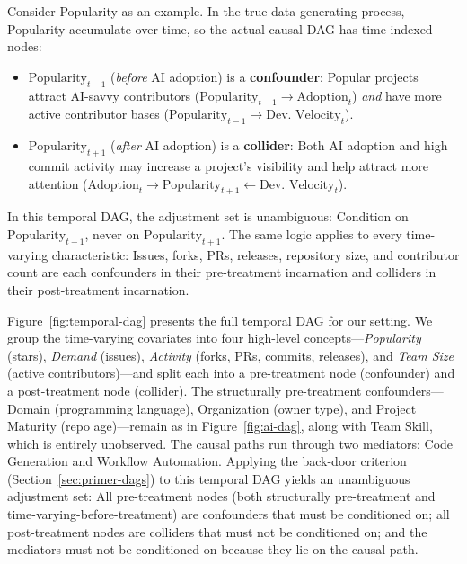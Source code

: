 Consider Popularity as an example.
In the true data-generating process, Popularity accumulate over time, so the actual causal DAG has time-indexed nodes:
\begin{itemize}[leftmargin=15pt]
    \item $\text{Popularity}_{t-1}$ (\emph{before} AI adoption) is a \textbf{confounder}: Popular projects attract AI-savvy contributors ($\text{Popularity}_{t-1} \to \text{Adoption}_t$) \emph{and} have more active contributor bases ($\text{Popularity}_{t-1} \to \text{Dev. Velocity}_t$).
    \item $\text{Popularity}_{t+1}$ (\emph{after} AI adoption) is a \textbf{collider}: Both AI adoption and high commit activity may increase a project's visibility and help attract more attention ($\text{Adoption}_t \to \text{Popularity}_{t+1} \leftarrow \text{Dev. Velocity}_t$).
\end{itemize}
In this temporal DAG, the adjustment set is unambiguous: Condition on $\text{Popularity}_{t-1}$, never on $\text{Popularity}_{t+1}$.
The same logic applies to every time-varying characteristic: Issues, forks, PRs, releases, repository size, and contributor count are each confounders in their pre-treatment incarnation and colliders in their post-treatment incarnation.

Figure~\ref{fig:temporal-dag} presents the full temporal DAG for our setting.
We group the time-varying covariates into four high-level concepts---\emph{Popularity} (stars), \emph{Demand} (issues), \emph{Activity} (forks, PRs, commits, releases), and \emph{Team Size} (active contributors)---and split each into a pre-treatment node (confounder) and a post-treatment node (collider).
The structurally pre-treatment confounders---Domain (programming language), Organization (owner type), and Project Maturity (repo age)---remain as in Figure~\ref{fig:ai-dag}, along with Team Skill, which is entirely unobserved.
The causal paths run through two mediators: Code Generation and Workflow Automation.
Applying the back-door criterion (Section~\ref{sec:primer-dags}) to this temporal DAG yields an unambiguous adjustment set: All pre-treatment nodes (both structurally pre-treatment and time-varying-before-treatment) are confounders that must be conditioned on; all post-treatment nodes are colliders that must not be conditioned on; and the mediators must not be conditioned on because they lie on the causal path.

